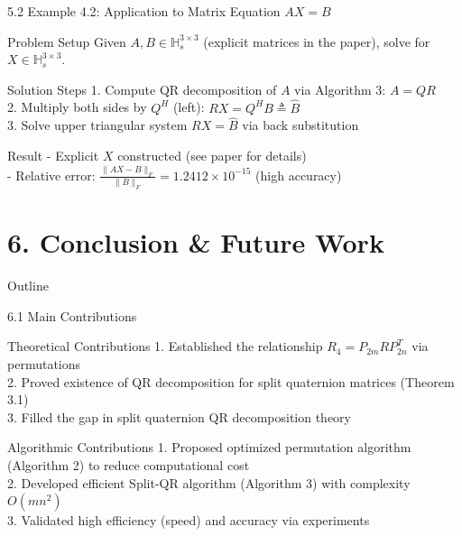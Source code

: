 \documentclass{beamer}
\begin{document}
\begin{frame}{5.2 Example 4.2: Application to Matrix Equation $AX = B$}
  \begin{block}{Problem Setup}
    Given $A,B \in \mathbb{H}_s^{3 \times 3}$ (explicit matrices in the paper), solve for $X \in \mathbb{H}_s^{3 \times 3}$.
  \end{block}
  
  \begin{block}{Solution Steps}
    1. Compute QR decomposition of $A$ via Algorithm 3: $A = QR$\\
    2. Multiply both sides by $Q^H$ (left): $RX = Q^H B \triangleq \hat{B}$\\
    3. Solve upper triangular system $RX = \hat{B}$ via back substitution
  \end{block}
  
  \begin{block}{Result}
    - Explicit $X$ constructed (see paper for details)\\
    - Relative error: $\frac{\|AX - B\|_F}{\|B\|_F} = 1.2412 \times 10^{-15}$ (high accuracy)
  \end{block}
\end{frame}

\section{6. Conclusion \& Future Work}
\begin{frame}{Outline}
  \tableofcontents[sectionstyle=show/shaded, subsectionstyle=show/show/shaded]
\end{frame}

\begin{frame}{6.1 Main Contributions}
  \begin{block}{Theoretical Contributions}
    1. Established the relationship $R_4 = P_{2m} R P_{2n}^T$ via permutations\\
    2. Proved existence of QR decomposition for split quaternion matrices (Theorem 3.1)\\
    3. Filled the gap in split quaternion QR decomposition theory
  \end{block}
  
  \begin{block}{Algorithmic Contributions}
    1. Proposed optimized permutation algorithm (Algorithm 2) to reduce computational cost\\
    2. Developed efficient Split-QR algorithm (Algorithm 3) with complexity $O(mn^2)$\\
    3. Validated high efficiency (speed) and accuracy via experiments
  \end{block}
\end{frame}
\end{document}
